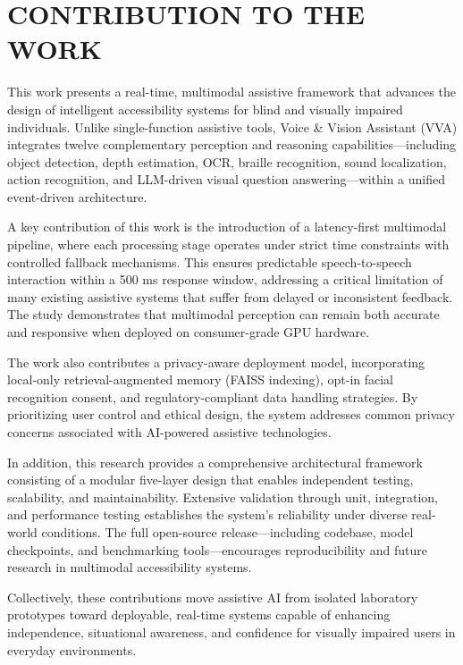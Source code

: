 \section{CONTRIBUTION TO THE WORK}

This work presents a real-time, multimodal assistive framework that advances the design of intelligent accessibility systems for blind and visually impaired individuals. Unlike single-function assistive tools, Voice \& Vision Assistant (VVA) integrates twelve complementary perception and reasoning capabilities—including object detection, depth estimation, OCR, braille recognition, sound localization, action recognition, and LLM-driven visual question answering—within a unified event-driven architecture.

A key contribution of this work is the introduction of a latency-first multimodal pipeline, where each processing stage operates under strict time constraints with controlled fallback mechanisms. This ensures predictable speech-to-speech interaction within a 500 ms response window, addressing a critical limitation of many existing assistive systems that suffer from delayed or inconsistent feedback. The study demonstrates that multimodal perception can remain both accurate and responsive when deployed on consumer-grade GPU hardware.

The work also contributes a privacy-aware deployment model, incorporating local-only retrieval-augmented memory (FAISS indexing), opt-in facial recognition consent, and regulatory-compliant data handling strategies. By prioritizing user control and ethical design, the system addresses common privacy concerns associated with AI-powered assistive technologies.

In addition, this research provides a comprehensive architectural framework consisting of a modular five-layer design that enables independent testing, scalability, and maintainability. Extensive validation through unit, integration, and performance testing establishes the system’s reliability under diverse real-world conditions. The full open-source release—including codebase, model checkpoints, and benchmarking tools—encourages reproducibility and future research in multimodal accessibility systems.

Collectively, these contributions move assistive AI from isolated laboratory prototypes toward deployable, real-time systems capable of enhancing independence, situational awareness, and confidence for visually impaired users in everyday environments.


